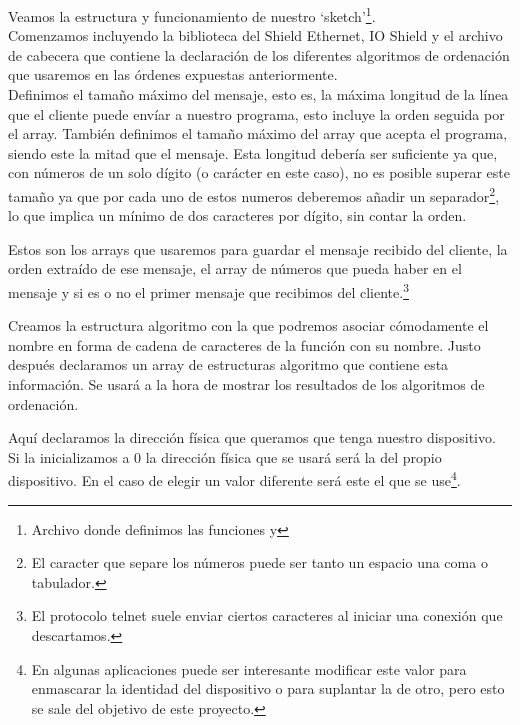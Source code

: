 Veamos la estructura y funcionamiento de nuestro `sketch'\protect\footnote{Archivo donde definimos las funciones  y }.\\

Comenzamos incluyendo la biblioteca del Shield Ethernet, IO Shield y el archivo de cabecera  que contiene la declaración de los diferentes algoritmos de ordenación que usaremos en las órdenes expuestas anteriormente.\\


Definimos el tamaño máximo del mensaje, esto es, la máxima longitud de la línea que el cliente puede envíar a nuestro programa, esto incluye la orden seguida por el array. También definimos el tamaño máximo del array que acepta el programa, siendo este la mitad que el mensaje. Esta longitud debería ser suficiente ya que, con números de un solo dígito (o carácter en este caso), no es posible superar este tamaño ya que por cada uno de estos numeros deberemos añadir un separador\protect\footnote{El caracter que separe los números puede ser tanto un espacio una coma o tabulador.}, lo que implica un mínimo de dos caracteres por dígito, sin contar la orden.


Estos son los arrays que usaremos para guardar el mensaje recibido del cliente, la orden extraído de ese mensaje, el array de números que pueda haber en el mensaje y si es o no el primer mensaje que recibimos del cliente.\protect\footnote{El protocolo telnet suele enviar ciertos caracteres al iniciar una conexión que descartamos.}


Creamos la estructura algoritmo con la que podremos asociar cómodamente el nombre en forma de cadena de caracteres de la función con su nombre. Justo después declaramos un array de estructuras algoritmo que contiene esta información. Se usará a la hora de mostrar los resultados de los algoritmos de ordenación.


Aquí declaramos la dirección física que queramos que tenga nuestro dispositivo. Si la inicializamos a 0 la dirección física que se usará será la del propio dispositivo. En el caso de elegir un valor diferente será este el que se use\protect\footnote{En algunas aplicaciones puede ser interesante modificar este valor para enmascarar la identidad del dispositivo o para suplantar la de otro, pero esto se sale del objetivo de este proyecto.}.

